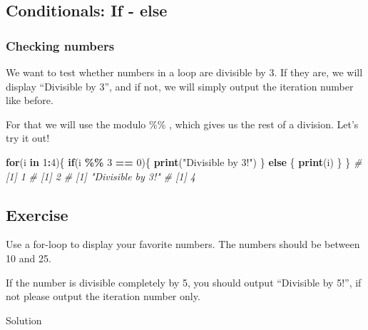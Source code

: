 \documentclass[
]{book}
\newenvironment{Shaded}{\begin{snugshade}}{\end{snugshade}}
\newcommand{\CommentTok}[1]{\textcolor[rgb]{0.56,0.35,0.01}{\textit{#1}}}
\newcommand{\ControlFlowTok}[1]{\textcolor[rgb]{0.13,0.29,0.53}{\textbf{#1}}}
\newcommand{\DecValTok}[1]{\textcolor[rgb]{0.00,0.00,0.81}{#1}}
\newcommand{\FunctionTok}[1]{\textcolor[rgb]{0.13,0.29,0.53}{\textbf{#1}}}
\newcommand{\NormalTok}[1]{#1}
\newcommand{\SpecialCharTok}[1]{\textcolor[rgb]{0.81,0.36,0.00}{\textbf{#1}}}
\newcommand{\StringTok}[1]{\textcolor[rgb]{0.31,0.60,0.02}{#1}}
\begin{document}
\subsection{Conditionals: If - else}\label{conditionals-if---else-1}

\subsubsection{Checking numbers \textbar{}}\label{checking-numbers}

We want to test whether numbers in a loop are divisible by 3. If they are, we will display ``Divisible by 3'', and if not, we will simply output the iteration number like before.

For that we will use the modulo \%\% , which gives us the rest of a division. Let's try it out!

\begin{Shaded}
\begin{Highlighting}[]
\ControlFlowTok{for}\NormalTok{(i }\ControlFlowTok{in} \DecValTok{1}\SpecialCharTok{:}\DecValTok{4}\NormalTok{)\{}
  \ControlFlowTok{if}\NormalTok{(i }\SpecialCharTok{\%\%} \DecValTok{3} \SpecialCharTok{==} \DecValTok{0}\NormalTok{)\{}
    \FunctionTok{print}\NormalTok{(}\StringTok{"Divisible by 3!"}\NormalTok{)}
\NormalTok{  \} }\ControlFlowTok{else}\NormalTok{ \{}
    \FunctionTok{print}\NormalTok{(i) }
\NormalTok{  \}}
\NormalTok{\}}
\CommentTok{\# [1] 1}
\CommentTok{\# [1] 2}
\CommentTok{\# [1] "Divisible by 3!"}
\CommentTok{\# [1] 4}
\end{Highlighting}
\end{Shaded}

\subsection{Exercise}\label{exercise-2}

Use a for-loop to display your favorite numbers.
The numbers should be between 10 and 25.

If the number is divisible completely by 5, you should output ``Divisible by 5!'', if not please output the iteration number only.

Solution
\end{document}
